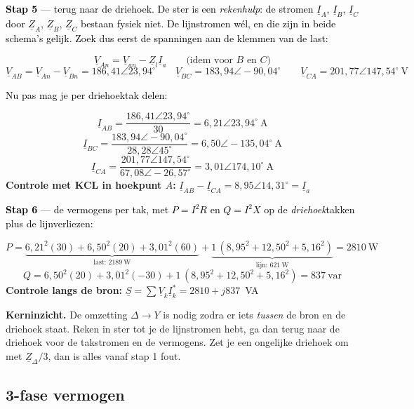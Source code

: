 \documentclass[a4paper,11pt]{article}
\newcommand{\stapreden}[1]{\par\vspace{1.4mm}\noindent\textcolor{black}{#1}\par\vspace{-2mm}}
\begin{document}
\begin{oefenblok}
    \stapreden{\textbf{Stap 5} --- terug naar de driehoek. De ster is een \emph{rekenhulp}: de stromen
        $\underline{I}_A$, $\underline{I}_B$, $\underline{I}_C$ door $\underline{Z}_A$, $\underline{Z}_B$,
        $\underline{Z}_C$ bestaan fysiek niet. De lijnstromen w\'el, en die zijn in beide schema's gelijk.
        Zoek dus eerst de spanningen aan de klemmen van de last:}
    \[\underline{V}_{An} = \underline{V}_{an} - \underline{Z}_l\underline{I}_a \qquad\text{(idem voor $B$ en $C$)}\]
    \[\underline{V}_{AB} = \underline{V}_{An} - \underline{V}_{Bn} = 186{,}41\angle 23{,}94^\circ \qquad
        \underline{V}_{BC} = 183{,}94\angle -90{,}04^\circ \qquad
        \underline{V}_{CA} = 201{,}77\angle 147{,}54^\circ\ \text{V}\]

    \stapreden{Nu pas mag je per driehoektak delen:}
    \[\underline{I}_{AB} = \frac{186{,}41\angle 23{,}94^\circ}{30} = \boxed{6{,}21\angle 23{,}94^\circ\ \text{A}}\]
    \[\underline{I}_{BC} = \frac{183{,}94\angle -90{,}04^\circ}{28{,}28\angle 45^\circ} = \boxed{6{,}50\angle -135{,}04^\circ\ \text{A}}\]
    \[\underline{I}_{CA} = \frac{201{,}77\angle 147{,}54^\circ}{67{,}08\angle -26{,}57^\circ} = \boxed{3{,}01\angle 174{,}10^\circ\ \text{A}}\]
    \textbf{Controle met KCL in hoekpunt $A$:}
    $\underline{I}_{AB} - \underline{I}_{CA} = 8{,}95\angle 14{,}31^\circ = \underline{I}_a$ \checkmark

    \stapreden{\textbf{Stap 6} --- de vermogens per tak, met $P = I^2R$ en $Q = I^2X$ op de
        \emph{driehoek}takken plus de lijnverliezen:}
    \[P = \underbrace{6{,}21^2(30) + 6{,}50^2(20) + 3{,}01^2(60)}_{\text{last: } 2189\ \text{W}}
        + \underbrace{1\,(8{,}95^2 + 12{,}50^2 + 5{,}16^2)}_{\text{lijn: } 621\ \text{W}}
        = \boxed{2810\ \text{W}}\]
    \[Q = 6{,}50^2(20) + 3{,}01^2(-30) + 1\,(8{,}95^2 + 12{,}50^2 + 5{,}16^2) = \boxed{837\ \text{var}}\]
    \textbf{Controle langs de bron:}
    $\underline{S} = \sum \underline{V}_k \underline{I}_k^{*} = 2810 + j837$~VA \checkmark

    \textbf{Kerninzicht.} De omzetting $\Delta \to Y$ is nodig zodra er iets \emph{tussen} de bron en
    de driehoek staat. Reken in ster tot je de lijnstromen hebt, ga dan terug naar de driehoek voor
    de takstromen en de vermogens. Zet je een ongelijke driehoek om met $\underline{Z}_\Delta/3$,
    dan is alles vanaf stap 1 fout.
\end{oefenblok}

\subsection{3-fase vermogen}
\end{document}
